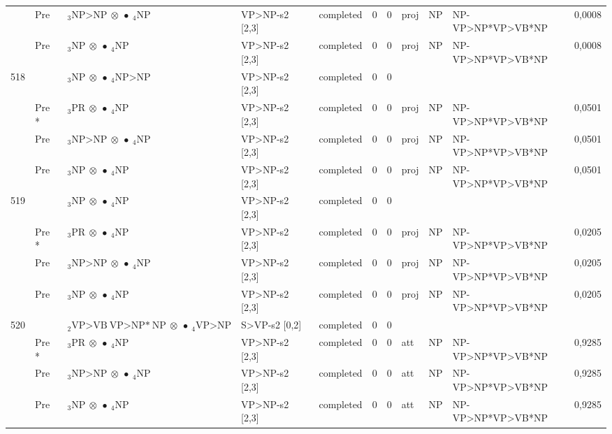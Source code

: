 \documentclass[10pt]{article}
\begin{document}
\begin{longtable}[htbp]{lllllllllll}
 & Pre & $ {}_3 \textrm{NP>NP} \  \otimes \  \bullet \ {}_{4} \textrm{NP} $ & VP>NP-s2 [2,3] & completed & 0 & 0 & proj & NP & NP-VP>NP*VP>VB*NP & 0,0008 \\ 
 & Pre & $ {}_3 \textrm{NP} \  \otimes \  \bullet \ {}_{4} \textrm{NP} $ & VP>NP-s2 [2,3] & completed & 0 & 0 & proj & NP & NP-VP>NP*VP>VB*NP & 0,0008 \\ 
518 & & $ {}_3 \textrm{NP} \  \otimes \  \bullet \ {}_{4} \textrm{NP>NP} $ & VP>NP-s2 [2,3] & completed & 0 & 0 & & & & \\ 
 & Pre *& $ {}_3 \textrm{PR} \  \otimes \  \bullet \ {}_{4} \textrm{NP} $ & VP>NP-s2 [2,3] & completed & 0 & 0 & proj & NP & NP-VP>NP*VP>VB*NP & 0,0501 \\ 
 & Pre & $ {}_3 \textrm{NP>NP} \  \otimes \  \bullet \ {}_{4} \textrm{NP} $ & VP>NP-s2 [2,3] & completed & 0 & 0 & proj & NP & NP-VP>NP*VP>VB*NP & 0,0501 \\ 
 & Pre & $ {}_3 \textrm{NP} \  \otimes \  \bullet \ {}_{4} \textrm{NP} $ & VP>NP-s2 [2,3] & completed & 0 & 0 & proj & NP & NP-VP>NP*VP>VB*NP & 0,0501 \\ 
519 & & $ {}_3 \textrm{NP} \  \otimes \  \bullet \ {}_{4} \textrm{NP} $ & VP>NP-s2 [2,3] & completed & 0 & 0 & & & & \\ 
 & Pre *& $ {}_3 \textrm{PR} \  \otimes \  \bullet \ {}_{4} \textrm{NP} $ & VP>NP-s2 [2,3] & completed & 0 & 0 & proj & NP & NP-VP>NP*VP>VB*NP & 0,0205 \\ 
 & Pre & $ {}_3 \textrm{NP>NP} \  \otimes \  \bullet \ {}_{4} \textrm{NP} $ & VP>NP-s2 [2,3] & completed & 0 & 0 & proj & NP & NP-VP>NP*VP>VB*NP & 0,0205 \\ 
 & Pre & $ {}_3 \textrm{NP} \  \otimes \  \bullet \ {}_{4} \textrm{NP} $ & VP>NP-s2 [2,3] & completed & 0 & 0 & proj & NP & NP-VP>NP*VP>VB*NP & 0,0205 \\ 
520 & & $ {}_2 \textrm{VP>VB} \ \textrm{VP>NP*} \ \textrm{NP} \  \otimes \  \bullet \ {}_{4} \textrm{VP>NP} $ & S>VP-s2 [0,2] & completed & 0 & 0 & & & & \\ 
 & Pre *& $ {}_3 \textrm{PR} \  \otimes \  \bullet \ {}_{4} \textrm{NP} $ & VP>NP-s2 [2,3] & completed & 0 & 0 & att & NP & NP-VP>NP*VP>VB*NP & 0,9285 \\ 
 & Pre & $ {}_3 \textrm{NP>NP} \  \otimes \  \bullet \ {}_{4} \textrm{NP} $ & VP>NP-s2 [2,3] & completed & 0 & 0 & att & NP & NP-VP>NP*VP>VB*NP & 0,9285 \\ 
 & Pre & $ {}_3 \textrm{NP} \  \otimes \  \bullet \ {}_{4} \textrm{NP} $ & VP>NP-s2 [2,3] & completed & 0 & 0 & att & NP & NP-VP>NP*VP>VB*NP & 0,9285 \\ 

\end{longtable}
\end{document}
